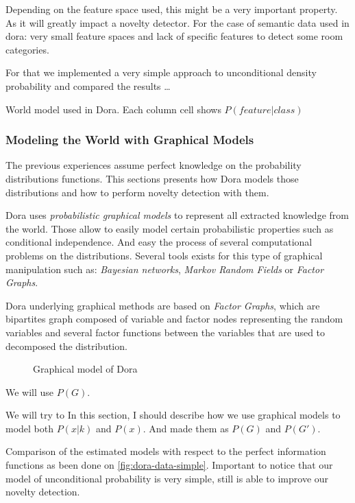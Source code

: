 \documentclass[a4paper]{article}
\begin{document}
Depending on the feature space used, this might be a very important property.
As it will greatly impact a novelty detector. For the case of semantic data used in dora:
very small feature spaces and lack of specific features to detect some room categories.

For that we implemented a very simple approach to unconditional density probability and compared the results
\dots

\begin{sidewaystable}[h]
\begin{center}
\scalebox{0.50}{}
\end{center}
\caption{\label{tab:dora-world-distribution}World model used in Dora. Each column cell shows $P(feature|class)$}
\end{sidewaystable}


\subsubsection{Modeling the World with Graphical Models}
The previous experiences assume perfect knowledge on the probability distributions functions.
This sections presents how Dora models those distributions and how to perform
novelty detection with them.

Dora uses \emph{probabilistic graphical models} to represent all extracted knowledge from the world.
Those allow to easily model certain probabilistic properties such as conditional independence.
And easy the process of several computational problems on the distributions.
Several tools exists for this type of graphical manipulation such as: \emph{Bayesian networks}, \emph{Markov Random Fields}
or \emph{Factor Graphs}.

Dora underlying graphical methods are based on \emph{Factor Graphs}\citep{kschischang2001factor}, which are bipartites graph composed of variable and factor nodes representing the random variables and several factor functions between the variables that are used to decomposed the distribution.


\begin{figure}
Graphical model of Dora
\end{figure}


We will use $P(G)$.

We will try to 
In this section, I should describe how we use graphical models to model both $P(x|k)$ and $P(x)$.
And made them as $P(G)$ and $P(G')$.

Comparison of the estimated models with respect to the perfect information functions as been done on
\autoref{fig:dora-data-simple}.
Important to notice that our model of unconditional probability is very simple, still is able to improve
our novelty detection.
\end{document}
